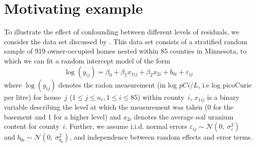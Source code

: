 \documentclass{article} %
\newcommand{\al}[1]{{\color{red} #1}}
\begin{document}
\section{Motivating example}\label{sec:ex}
To illustrate the effect of confounding between different levels of residuals, we consider the data set discussed by
 \cite{Gelman:2006ue}. This data set consists of a stratified random sample of 919 owner-occupied homes nested within 85 counties in Minnesota, 
to which we can fit a random intercept model of the form
%
\begin{equation}\label{eq:radon}
  \log(y_{ij}) = \beta_0 + \beta_1 x_{1ij} + \beta_2 x_{2i} + b_{0i} + \varepsilon_{ij}
\end{equation}
%
where   $\log(y_{ij})$ denotes the  radon measurement (in log $pCi/L$, i.e log picoCurie per litre) for house~$j$ ($1 \le j \le n_i, 1 \le i \le 85$) within county~$i$,
 $x_{1ij}$ is a binary variable describing the level at which the measurement was taken (0 for the basement and 1 for a higher level) and $x_{2i}$ denotes the average soil uranium content for  county~$i$. 
 Further, we assume i.i.d. normal errors $\varepsilon_{ij} \sim \mathcal{N} (0,\ \sigma^2_{\varepsilon})$  and $b_{0i} \sim \mathcal{N}(0,\ \sigma^2_{b_0})$, and independence between random effects and error \al{terms}. 
\end{document}
